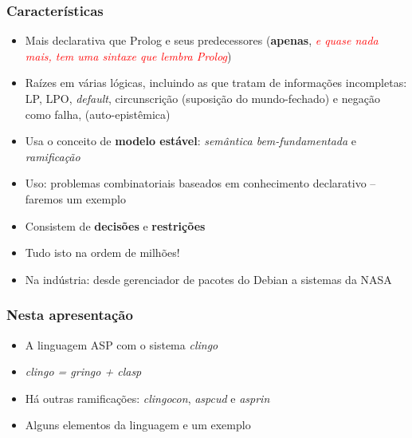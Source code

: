 \documentclass{beamer}
\begin{document}
\begin{frame}[fragile]

\frametitle{Características}


\begin{block}{}
  \begin{itemize}
  
  \item Mais declarativa que Prolog e seus predecessores (\textbf{apenas}, \textcolor{red}{\emph{e quase nada mais, tem uma sintaxe que lembra Prolog}})

  \item Raízes em várias lógicas, incluindo as que tratam de informações incompletas: LP, LPO, \emph{default}, circunscrição (suposição do mundo-fechado) e negação como falha, (auto-epistêmica)
  
  \item Usa o conceito de \textbf{modelo estável}: \emph{semântica bem-fundamentada} e \emph{ramificação}

  \item Uso: problemas combinatoriais baseados em conhecimento declarativo -- faremos um exemplo

  \item Consistem de \textbf{decisões} e \textbf{restrições}

      \item Tudo isto na ordem de milhões!
      
      \item Na indústria: desde gerenciador de pacotes do Debian a sistemas da NASA
      
        

    \end{itemize}
  
\end{block}


\end{frame}


\begin{frame}[fragile]

\frametitle{Nesta apresentação}


\begin{block}{}
  \begin{itemize}
  
  \item A linguagem ASP com o sistema \emph{clingo}
  \item \emph{clingo = gringo + clasp}
  \item Há outras ramificações: \emph{clingocon}, \emph{aspcud} e \emph{asprin}
  \item Alguns elementos da linguagem e um exemplo

    \end{itemize}
  
 \end{block}

\end{frame}
\end{document}
